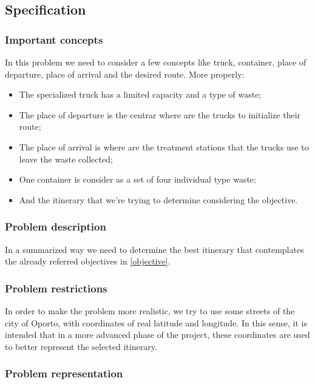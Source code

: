 \documentclass[a4paper]{article}
\begin{document}
\subsection{Specification}
\subsubsection{Important concepts}

In this problem we need to consider a few concepts like truck, container, place of departure, place of arrival and the desired route. More properly:

\begin{itemize}
	\item The specialized truck has a limited capacity and a type of waste;
	\item The place of departure is the centrar where are the trucks to initialize their route;
	\item The place of arrival is where are the treatment stations that the trucks use to leave the waste collected;
	\item One container is consider as a set of four individual type waste;
	\item And the itinerary that we're trying to determine considering the objective. 
\end{itemize}

\subsubsection{Problem description}

In a summarized way we need to determine the best itinerary that contemplates the already referred objectives in \ref{objective}.

\subsubsection{Problem restrictions}

In order to make the problem more realistic, we try to use some streets of the city of Oporto, with coordinates of real latitude and longitude. In this sense, it is intended that in a more advanced phase of the project, these coordinates are used to better represent the selected itinerary. 

\subsubsection{Problem representation}
\end{document}
